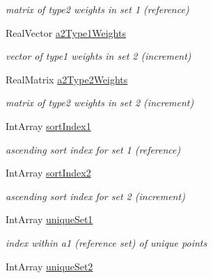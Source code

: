 \begin{DoxyCompactItemize}
\begin{DoxyCompactList}\small\item\em matrix of type2 weights in set 1 (reference) \end{DoxyCompactList}\item 
Real\+Vector \hyperlink{classPecos_1_1CombinedSparseGridDriver_afec3beee6f5e73b3caf88b654c7aad87}{a2\+Type1\+Weights}\label{classPecos_1_1CombinedSparseGridDriver_afec3beee6f5e73b3caf88b654c7aad87}

\begin{DoxyCompactList}\small\item\em vector of type1 weights in set 2 (increment) \end{DoxyCompactList}\item 
Real\+Matrix \hyperlink{classPecos_1_1CombinedSparseGridDriver_acbf578a52f419b34f44a61a0bdb82111}{a2\+Type2\+Weights}\label{classPecos_1_1CombinedSparseGridDriver_acbf578a52f419b34f44a61a0bdb82111}

\begin{DoxyCompactList}\small\item\em matrix of type2 weights in set 2 (increment) \end{DoxyCompactList}\item 
Int\+Array \hyperlink{classPecos_1_1CombinedSparseGridDriver_a01105153b0232b8b5c9e190ecece5e90}{sort\+Index1}\label{classPecos_1_1CombinedSparseGridDriver_a01105153b0232b8b5c9e190ecece5e90}

\begin{DoxyCompactList}\small\item\em ascending sort index for set 1 (reference) \end{DoxyCompactList}\item 
Int\+Array \hyperlink{classPecos_1_1CombinedSparseGridDriver_aba180f01abdd3fc7d200630ace4b0a74}{sort\+Index2}\label{classPecos_1_1CombinedSparseGridDriver_aba180f01abdd3fc7d200630ace4b0a74}

\begin{DoxyCompactList}\small\item\em ascending sort index for set 2 (increment) \end{DoxyCompactList}\item 
Int\+Array \hyperlink{classPecos_1_1CombinedSparseGridDriver_a042d0898a71b7ef73e7569addacddca7}{unique\+Set1}\label{classPecos_1_1CombinedSparseGridDriver_a042d0898a71b7ef73e7569addacddca7}

\begin{DoxyCompactList}\small\item\em index within a1 (reference set) of unique points \end{DoxyCompactList}\item 
Int\+Array \hyperlink{classPecos_1_1CombinedSparseGridDriver_a38fa3e0f8aef40bae0a33fd9711a89a2}{unique\+Set2}\label{classPecos_1_1CombinedSparseGridDriver_a38fa3e0f8aef40bae0a33fd9711a89a2}


\end{DoxyCompactItemize}
